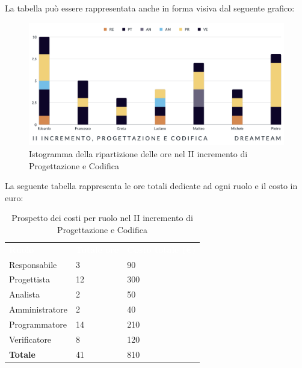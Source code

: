 La tabella può essere rappresentata anche in forma visiva dal seguente grafico:
\begin{figure}[H]
\centering
\includegraphics[scale=0.55]{Sezioni/SezioniPreventivo/grafici/Preventivo_progettazione_II.png}
\caption{Istogramma della ripartizione delle ore nel II incremento di Progettazione e Codifica}
\end{figure}

La seguente tabella rappresenta le ore totali dedicate ad ogni ruolo e il costo in euro:

\begin{table}[H]
\begin{center}
\renewcommand{\arraystretch}{1.5}
\begin{tabular}{ m{}<{\centering}  m{}<{\centering} m{}<{\centering}}
	\rowcolor{darkblue}
	\textcolor{white}{\textbf{Ruolo}}&\textcolor{white}{\textbf{Totale ore}}&\textcolor{white}{\textbf{Costo totale (\euro)}}\\ 

	Responsabile  & 3 & 90 \\	
	
	Progettista & 12 & 300 \\
	
	Analista & 2 & 50 \\

	Amministratore & 2 & 40 \\
	
	Programmatore & 14 & 210 \\
	
	Verificatore & 8 & 120 \\
	
	\textbf{Totale} & 41 & 810 \\
	
\end{tabular}
\caption{Prospetto dei costi per ruolo nel II incremento di Progettazione e Codifica}
\end{center}
\end{table}


